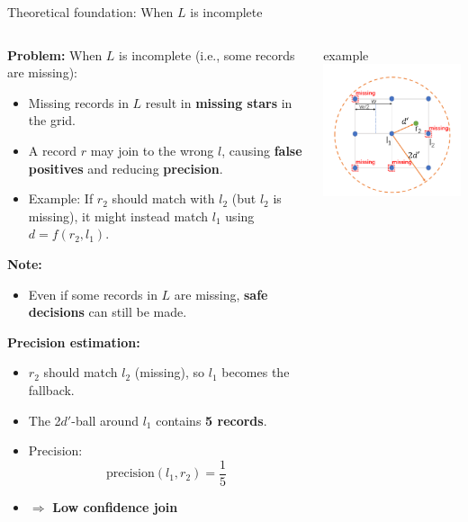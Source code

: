 \documentclass[8pt]{beamer} %
\begin{document}
\begin{frame}{Theoretical foundation: When $L$ is incomplete}
	\begin{columns}
		\begin{column}{0.53\textwidth}
			\textbf{Problem:} When $L$ is incomplete (i.e., some records are missing):
			\begin{itemize}
				\item Missing records in $L$ result in \textbf{missing stars} in the grid.
				\item A record $r$ may join to the wrong $l$, causing \textbf{false positives} and reducing \textbf{precision}.
				\item Example: If $r_2$ should match with $l_2$ (but $l_2$ is missing), it might instead match $l_1$ using $d = f(r_2, l_1)$.
			\end{itemize}
			

			\textbf{Note:}
			\begin{itemize}
				\item Even if some records in $L$ are missing, \textbf{safe decisions} can still be made.
			\end{itemize}
			

			\textbf{Precision estimation:}
			\begin{itemize}
				\item $r_2$ should match $l_2$ (missing), so $l_1$ becomes the fallback.
				\item The 2$d'$-ball around $l_1$ contains \textbf{5 records}.
				\item Precision:
				$$
				\text{precision}(l_1, r_2) = \frac{1}{5}
				$$
				\item $\Rightarrow$ \textbf{Low confidence join}
			\end{itemize}
		\end{column}
		
		\begin{column}{0.43\textwidth}
			\begin{beamercolorbox}[rounded=true, shadow=true, leftskip=1em, rightskip=1em]{example}		
				\centering
				\includegraphics[width=0.7\linewidth]{img/img-join-precision-incomplete.png}
			

\end{beamercolorbox}
\end{column}
\end{columns}
\end{frame}
\end{document}
